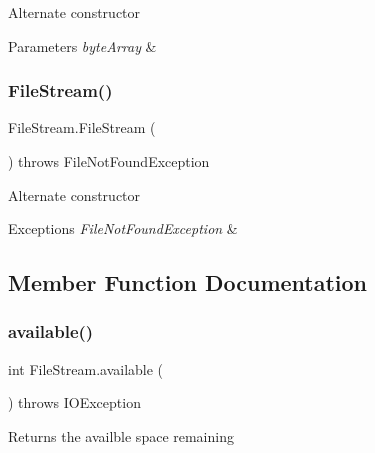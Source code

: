 Alternate constructor 
\begin{DoxyParams}{Parameters}
{\em byte\+Array} & \\
\hline
\end{DoxyParams}
\mbox{\label{class_file_stream_aa919eed4082491d09520911563d44efd}} 
\subsubsection{\texorpdfstring{File\+Stream()}{FileStream()}\hspace{0.1cm}{\footnotesize\ttfamily [3/3]}}
{\footnotesize\ttfamily File\+Stream.\+File\+Stream (\begin{DoxyParamCaption}{ }\end{DoxyParamCaption}) throws File\+Not\+Found\+Exception\hspace{0.3cm}{\ttfamily [inline]}}

Alternate constructor 
\begin{DoxyExceptions}{Exceptions}
{\em File\+Not\+Found\+Exception} & \\
\hline
\end{DoxyExceptions}


\subsection{Member Function Documentation}
\mbox{\label{class_file_stream_a7dd240b96afa9e37f9a6bd8e4b99e48b}} 
\subsubsection{\texorpdfstring{available()}{available()}}
{\footnotesize\ttfamily int File\+Stream.\+available (\begin{DoxyParamCaption}{ }\end{DoxyParamCaption}) throws I\+O\+Exception\hspace{0.3cm}{\ttfamily [inline]}}

Returns the availble space remaining \mbox{\label{class_file_stream_a0e12c8a0391372eebb0d444014af6c58}} 
